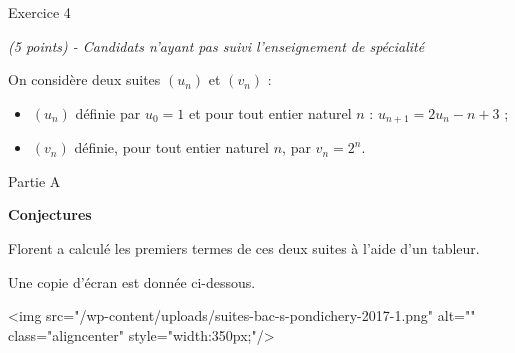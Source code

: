 
%
\begin{h2}Exercice 4\end{h2}
\textit{(5 points) - Candidats n'ayant pas suivi l'enseignement de spécialité}
\par
On considère deux suites $\left(u_n\right)$ et $\left(v_n\right)$ :
\begin{itemize}
     \item
     $\left(u_n\right)$ définie par $u_0 = 1$ et pour tout entier naturel $n$ :  $u_{n+1} = 2u_n-n+3$ ;
     \item
     $\left(v_n\right)$ définie, pour tout entier naturel $n$, par $v_n = 2^n$.
\end{itemize}
\begin{h3}Partie A\end{h3}
\textbf{ Conjectures}
\par
Florent a calculé les premiers termes de ces deux suites à l'aide d'un tableur.
\par
Une copie d'écran est donnée ci-dessous.

\begin{center}
\end{center}
<img src="/wp-content/uploads/suites-bac-s-pondichery-2017-1.png" alt="" class="aligncenter" style="width:350px;"/>

